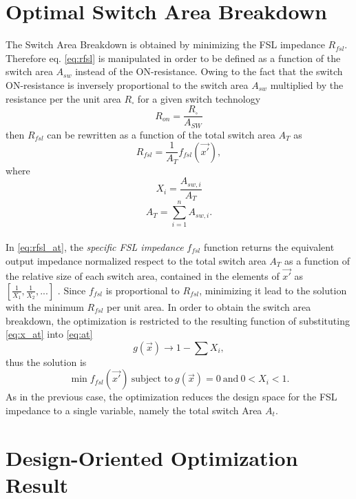\section{Optimal Switch Area Breakdown}
The Switch Area Breakdown is obtained by minimizing the FSL impedance $R_{fsl}$. Therefore eq. \eqref{eq:rfsl} is manipulated in order to be defined as a function of the switch area $A_{sw}$ instead of the ON-resistance. Owing to the fact that the switch ON-resistance is inversely proportional to the switch area $A_{sw}$ multiplied by the resistance per the unit area $R_{\square}$ for a given switch technology
\begin{equation}
R_{on}=\frac{R_\square}{A_{SW}}
\label{eq:ron}
\end{equation}
then $R_{fsl}$ can be rewritten as a function of the total switch area $A_{T}$ as
\begin{equation}
R_{fsl}=\frac{1}{A_T } f_{fsl}\left(\vec{x'}\right),
\label{eq:rfsl_at}
\end{equation}
where
\begin{equation}
X_i = \frac{A_{sw,i}}{A_T}
\label{eq:x_at}
\end{equation}
\begin{equation}
A_T = \sum_{i=1}^n A_{sw,i}.
\label{eq:at}
\end{equation}
\\
 In \eqref{eq:rfsl_at}, the \emph{specific FSL impedance} $f_{fsl}$ function returns the equivalent output impedance normalized respect to the total switch area $A_T$ as a function of the relative size of each switch area, contained in the elements of  $\vec{x'}$  as  $[ \frac{1}{X_1},\frac{1}{X_2},...]$ . Since $f_{fsl}$ is proportional to $R_{fsl}$, minimizing it lead to the solution with the minimum $R_{fsl}$ per unit area. In order to obtain the switch area breakdown, the optimization is restricted to the resulting function of substituting \eqref{eq:x_at} into \eqref{eq:at}
\begin{equation}
g(\vec{x}) \to 1- \sum X_i,
\label{eq:g_x_at}
\end{equation}
thus the solution is
\begin{equation}
\min{f_{fsl}(\vec{x'})} \: \text{subject to} \: g(\vec{x}) = 0 \: \text{and} \: 0 < X_i < 1.
\label{eq:min_fsl}
\end{equation}
As in the previous case, the optimization reduces the design space for the FSL impedance to a single variable, namely the total switch Area $A_t$.

\section{Design-Oriented Optimization Result}

